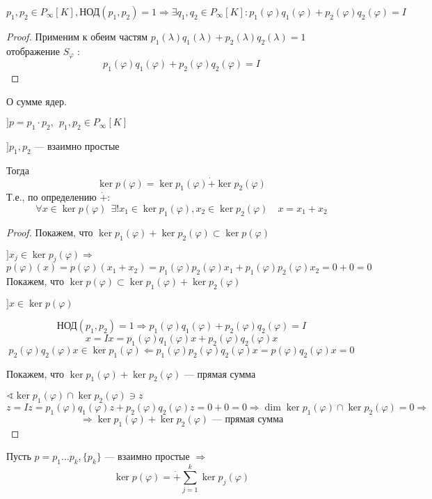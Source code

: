 \begin{lemma}
    $p_1, p_2 \in P_\infty[K], \text{НОД}(p_1, p_2)=1\Rightarrow \exists q_1, q_2\in P_\infty[K] : p_1(\varphi)q_1(\varphi)+p_2(\varphi)q_2(\varphi)=I$
\end{lemma}
\begin{proof}
    Применим к обеим частям $p_1(\lambda)q_1(\lambda)+p_2(\lambda)q_2(\lambda)=1$ отображение $S_\varphi$ :
    $$p_1(\varphi)q_1(\varphi)+p_2(\varphi)q_2(\varphi)=I$$
\end{proof}

\begin{theorem}
    О сумме ядер.

    $] p=p_1\cdot p_2, \ \ p_1, p_2\in P_\infty[K]$

    $] p_1, p_2$ --- взаимно простые

    Тогда
    $$\ker p(\varphi)=\ker p_1(\varphi)\dot+\ker p_2(\varphi)$$
    Т.е., по определению $\dot+$:
    $$\forall x\in\ker p(\varphi) \ \ \exists! x_1\in\ker p_1(\varphi), x_2\in \ker p_2(\varphi) \quad x=x_1+x_2$$
\end{theorem}
\begin{proof}
    Покажем, что $\ker p_1(\varphi)+\ker p_2(\varphi)\subset \ker p(\varphi)$

    $] x_j\in \ker p_j(\varphi) \Rightarrow$
    $$p(\varphi)(x)=p(\varphi)(x_1+x_2)=p_1(\varphi)p_2(\varphi)x_1+p_1(\varphi)p_2(\varphi)x_2=0+0=0$$
    Покажем, что $\ker p(\varphi)\subset \ker p_1(\varphi)+\ker p_2(\varphi)$

    $] x\in\ker p(\varphi)$

    $$\text{НОД}(p_1, p_2)=1 \Rightarrow p_1(\varphi)q_1(\varphi)+p_2(\varphi)q_2(\varphi)=I$$
    $$x=Ix = p_1(\varphi)q_1(\varphi)x+p_2(\varphi)q_2(\varphi)x$$
    $$p_2(\varphi)q_2(\varphi)x\in\ker p_1(\varphi)\Leftarrow p_1(\varphi)p_2(\varphi)q_2(\varphi)x=p(\varphi)q_2(\varphi)x=0$$

    Покажем, что $\ker p_1(\varphi)+\ker p_2(\varphi)$ --- прямая сумма

    $\sphericalangle \ker p_1(\varphi)\cap \ker p_2(\varphi)\ni z$
    $$z=Iz=p_1(\varphi)q_1(\varphi)z+p_2(\varphi)q_2(\varphi)z=0+0=0\Rightarrow \dim \ker p_1(\varphi)\cap\ker p_2(\varphi)=0\Rightarrow$$
    $$\Rightarrow \ker p_1(\varphi)+\ker p_2(\varphi) \text{ --- прямая сумма}$$
\end{proof}

\begin{remark}
    Пусть $p=p_1\ldots p_k, \{p_k\}$ --- взаимно простые $\Rightarrow$
    $$\ker p(\varphi)=\dot+\sum_{j=1}^k \ker p_j(\varphi)$$
\end{remark}


